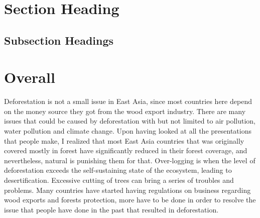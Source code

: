 \documentclass{book}\usepackage{knitr}
\begin{document}
\begin{knitrout}
\begin{kframe}
\section{Section Heading}%

\subsection{Subsection Headings} %





\section{Overall}
Deforestation is not a small issue in East Asia, since most countries here depend on the money source they got from the wood export industry. There are many issues that could be caused by deforestation with but not limited to air pollution, water pollution and climate change. Upon having looked at all the presentations that people make, I realized that most East Asia countries that was originally covered mostly in forest have significantly reduced in their forest coverage, and nevertheless, natural is punishing them for that. Over-logging is when the level of deforestation exceeds the self-sustaining state of the ecosystem, leading to desertification. Excessive cutting of trees can bring a series of troubles and problems. Many countries have started having regulations on business regarding wood exports and forests protection, more have to be done in order to resolve the issue that people have done in the past that resulted in deforestation. 


\end{kframe}
\end{knitrout}
\end{document}
